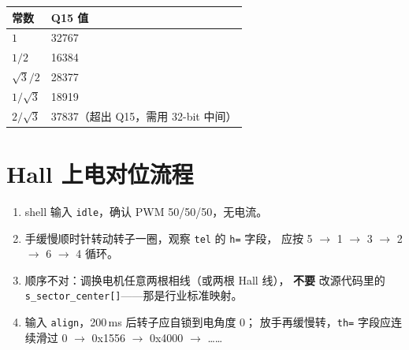 \documentclass[UTF8,a4paper,11pt]{ctexart}
\newcommand{\code}[1]{\texttt{#1}}
\begin{document}
\begin{tabular}{ll}
\toprule
常数 & Q15 值 \\
\midrule
$1$           & 32767 \\
$1/2$         & 16384 \\
$\sqrt 3/2$   & 28377 \\
$1/\sqrt 3$   & 18919 \\
$2/\sqrt 3$   & 37837（超出 Q15，需用 32-bit 中间） \\
\bottomrule
\end{tabular}

\section{Hall 上电对位流程}

\begin{enumerate}
  \item shell 输入 \code{idle}，确认 PWM 50/50/50，无电流。
  \item 手缓慢顺时针转动转子一圈，观察 \code{tel} 的 \code{h=} 字段，
        应按 5 $\to$ 1 $\to$ 3 $\to$ 2 $\to$ 6 $\to$ 4 循环。
  \item 顺序不对：调换电机任意两根相线（或两根 Hall 线），
        \textbf{不要} 改源代码里的 \code{s\_sector\_center[]}——那是行业标准映射。
  \item 输入 \code{align}，200\,ms 后转子应自锁到电角度 0；
        放手再缓慢转，\code{th=} 字段应连续滑过 0 $\to$ 0x1556 $\to$ 0x4000 $\to$ ……
\end{enumerate}
\end{document}
